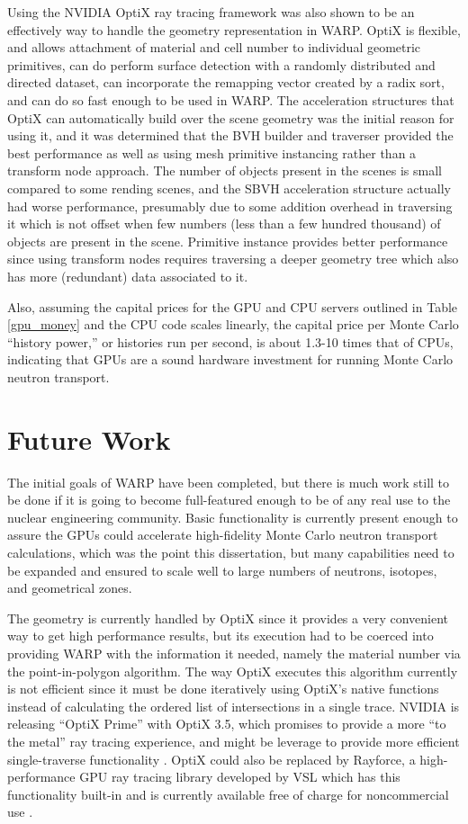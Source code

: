 Using the NVIDIA OptiX ray tracing framework was also shown to be an effectively way to handle the geometry representation in WARP.  OptiX is flexible, and allows attachment of material and cell number to individual geometric primitives, can do perform surface detection with a randomly distributed and directed dataset, can incorporate the remapping vector created by a radix sort, and can do so fast enough to be used in WARP.  The acceleration structures that OptiX can automatically build over the scene geometry was the initial reason for using it, and it was determined that the BVH builder and traverser provided the best performance as well as using mesh primitive instancing rather than a transform node approach.  The number of objects present in the scenes is small compared to some rending scenes, and the SBVH acceleration structure actually had worse performance, presumably due to some addition overhead in traversing it which is not offset when few numbers (less than a few hundred thousand) of objects are present in the scene.  Primitive instance provides better performance since using transform nodes requires traversing a deeper geometry tree which also has more (redundant) data associated to it.

Also, assuming the capital prices for the GPU and CPU servers outlined in Table \ref{gpu_money} and the CPU code scales linearly, the capital price per Monte Carlo ``history power,'' or histories run per second, is about 1.3-10 times that of CPUs, indicating that GPUs are a sound hardware investment for running Monte Carlo neutron transport.

\section{Future Work}

The initial goals of WARP have been completed, but there is much work still to be done if it is going to become full-featured enough to be of any real use to the nuclear engineering community.  Basic functionality is currently present enough to assure the GPUs could accelerate high-fidelity Monte Carlo neutron transport calculations, which was the point this dissertation, but many capabilities need to be expanded and ensured to scale well to large numbers of neutrons, isotopes, and geometrical zones.

The geometry is currently handled by OptiX since it provides a very convenient way to get high performance results, but its execution had to be coerced into providing WARP with the information it needed, namely the material number via the point-in-polygon algorithm.  The way OptiX executes this algorithm currently is not efficient since it must be done iteratively using OptiX's native functions instead of calculating the ordered list of intersections in a single trace.  NVIDIA is releasing ``OptiX Prime'' with OptiX 3.5, which promises to provide a more ``to the metal'' ray tracing experience, and might be leverage to provide more efficient single-traverse functionality \cite{optix3.5}.  OptiX could also be replaced by Rayforce, a high-performance GPU ray tracing library developed by VSL which has this functionality built-in and is currently available free of charge for noncommercial use \cite{rayforce}.

